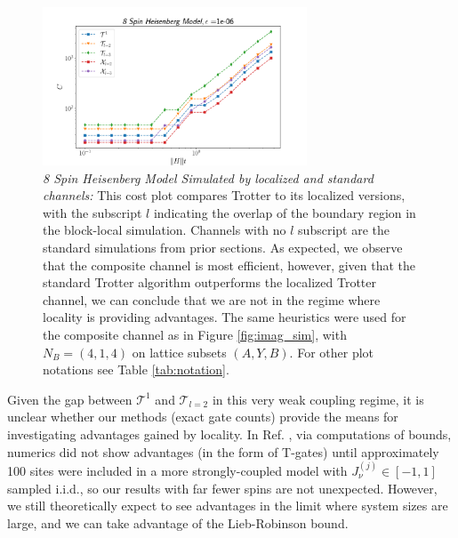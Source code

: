 \begin{figure}[htbp!]
    \centering
    \includegraphics[width=0.7\textwidth]{composite_numerics/local_Heisen8.png}
    \caption{\textit{8 Spin Heisenberg Model Simulated by localized and standard channels:} This cost plot compares Trotter to its  localized versions, with the subscript $l$ indicating the overlap of the boundary region in the block-local simulation.  Channels with no $l$ subscript are the standard simulations from prior sections. As expected, we observe that the composite channel is most efficient, however, given that the standard Trotter algorithm outperforms the localized Trotter channel, we can conclude that we are not in the regime where locality is providing advantages. The same heuristics were used for the composite channel as in Figure \ref{fig:imag_sim}, with $N_B = (4,1,4)$ on lattice subsets $(A, Y, B)$. For other plot notations see Table \ref{tab:notation}.} \label{fig:local_heisen}
\end{figure} 
\FloatBarrier

Given the gap between $\mathcal{T}^1$ and $\mathcal{T}_{l=2}$ in this very weak coupling regime, it is unclear whether our methods (exact gate counts) provide the means for investigating advantages gained by locality. In Ref. \cite{haah2021quantum}, via computations of bounds, numerics did not show advantages (in the form of T-gates) until approximately 100 sites were included in a more strongly-coupled model with $J_\nu^{(j)} \in [-1, 1]$ sampled i.i.d., so our results with far fewer spins are not unexpected. However, we still theoretically expect to see advantages in the limit where system sizes are large, and we can take advantage of the Lieb-Robinson bound.
